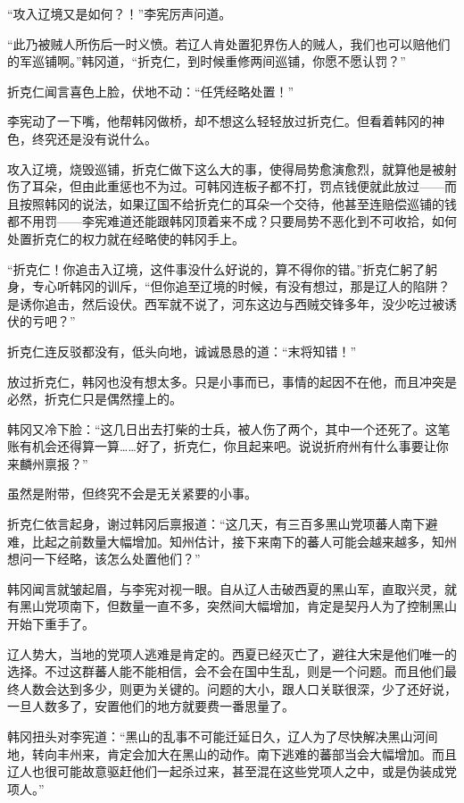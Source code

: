 “攻入辽境又是如何？！”李宪厉声问道。

“此乃被贼人所伤后一时义愤。若辽人肯处置犯界伤人的贼人，我们也可以赔他们的军巡铺啊。”韩冈道，“折克仁，到时候重修两间巡铺，你愿不愿认罚？”

折克仁闻言喜色上脸，伏地不动：“任凭经略处置！”

李宪动了一下嘴，他帮韩冈做桥，却不想这么轻轻放过折克仁。但看着韩冈的神色，终究还是没有说什么。

攻入辽境，烧毁巡铺，折克仁做下这么大的事，使得局势愈演愈烈，就算他是被射伤了耳朵，但由此重惩也不为过。可韩冈连板子都不打，罚点钱便就此放过——而且按照韩冈的说法，如果辽国不给折克仁的耳朵一个交待，他甚至连赔偿巡铺的钱都不用罚——李宪难道还能跟韩冈顶着来不成？只要局势不恶化到不可收拾，如何处置折克仁的权力就在经略使的韩冈手上。

“折克仁！你追击入辽境，这件事没什么好说的，算不得你的错。”折克仁躬了躬身，专心听韩冈的训斥，“但你追至辽境的时候，有没有想过，那是辽人的陷阱？是诱你追击，然后设伏。西军就不说了，河东这边与西贼交锋多年，没少吃过被诱伏的亏吧？”

折克仁连反驳都没有，低头向地，诚诚恳恳的道：“末将知错！”

放过折克仁，韩冈也没有想太多。只是小事而已，事情的起因不在他，而且冲突是必然，折克仁只是偶然撞上的。

韩冈又冷下脸：“这几日出去打柴的士兵，被人伤了两个，其中一个还死了。这笔账有机会还得算一算……好了，折克仁，你且起来吧。说说折府州有什么事要让你来麟州禀报？”

虽然是附带，但终究不会是无关紧要的小事。

折克仁依言起身，谢过韩冈后禀报道：“这几天，有三百多黑山党项蕃人南下避难，比起之前数量大幅增加。知州估计，接下来南下的蕃人可能会越来越多，知州想问一下经略，该怎么处置他们？”

韩冈闻言就皱起眉，与李宪对视一眼。自从辽人击破西夏的黑山军，直取兴灵，就有黑山党项南下，但数量一直不多，突然间大幅增加，肯定是契丹人为了控制黑山开始下重手了。

辽人势大，当地的党项人逃难是肯定的。西夏已经灭亡了，避往大宋是他们唯一的选择。不过这群蕃人能不能相信，会不会在国中生乱，则是一个问题。而且他们最终人数会达到多少，则更为关键的。问题的大小，跟人口关联很深，少了还好说，一旦人数多了，安置他们的地方就要费一番思量了。

韩冈扭头对李宪道：“黑山的乱事不可能迁延日久，辽人为了尽快解决黑山河间地，转向丰州来，肯定会加大在黑山的动作。南下逃难的蕃部当会大幅增加。而且辽人也很可能故意驱赶他们一起杀过来，甚至混在这些党项人之中，或是伪装成党项人。”

